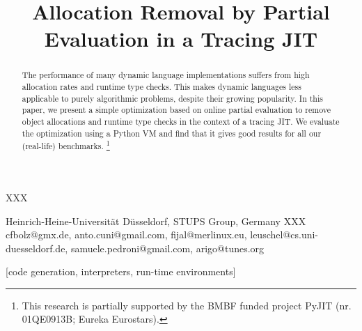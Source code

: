 \documentclass{sigplanconf}
\def\sharedaffiliation{%
\end{tabular}
\begin{tabular}{c}}
\begin{document}
 {XXX}

\title{Allocation Removal by Partial Evaluation in a Tracing JIT}

           {Heinrich-Heine-Universität Düsseldorf, STUPS Group, Germany XXX}
           {cfbolz@gmx.de, anto.cuni@gmail.com, fijal@merlinux.eu,
           leuschel@cs.uni-duesseldorf.de, samuele.pedroni@gmail.com, arigo@tunes.org}


\maketitle
\begin{abstract}
The performance of many dynamic language implementations suffers from
high allocation rates and runtime type checks.  This makes dynamic
languages less applicable to purely algorithmic problems, despite their
growing popularity.  In this paper, we present a simple optimization
based on online partial evaluation to remove object allocations and
runtime type checks in the context of a tracing JIT.  We evaluate the
optimization using a Python VM and find that it gives good results for
all our (real-life) benchmarks.
\footnote{This research is partially supported by the BMBF funded project PyJIT (nr. 01QE0913B;
Eureka Eurostars).}
\end{abstract}


[code generation,
interpreters, run-time environments]
\end{document}
